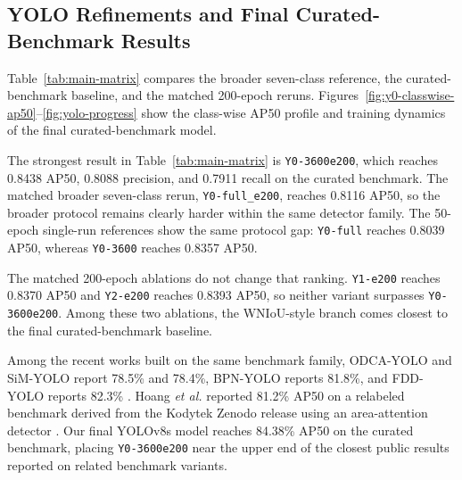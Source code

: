 \documentclass[10pt,a4paper]{article}
\begin{document}
\subsection{YOLO Refinements and Final Curated-Benchmark Results}
\label{sec:main-results}

Table~\ref{tab:main-matrix} compares the broader seven-class reference, the curated-benchmark baseline, and the matched 200-epoch reruns. Figures~\ref{fig:y0-classwise-ap50}--\ref{fig:yolo-progress} show the class-wise AP50 profile and training dynamics of the final curated-benchmark model.

The strongest result in Table~\ref{tab:main-matrix} is \texttt{Y0-3600e200}, which reaches 0.8438 AP50, 0.8088 precision, and 0.7911 recall on the curated benchmark. The matched broader seven-class rerun, \texttt{Y0-full\_e200}, reaches 0.8116 AP50, so the broader protocol remains clearly harder within the same detector family. The 50-epoch single-run references show the same protocol gap: \texttt{Y0-full} reaches 0.8039 AP50, whereas \texttt{Y0-3600} reaches 0.8357 AP50.

The matched 200-epoch ablations do not change that ranking. \texttt{Y1-e200} reaches 0.8370 AP50 and \texttt{Y2-e200} reaches 0.8393 AP50, so neither variant surpasses \texttt{Y0-3600e200}. Among these two ablations, the WNIoU-style branch comes closest to the final curated-benchmark baseline.

Among the recent works built on the same benchmark family, ODCA-YOLO and SiM-YOLO report 78.5\% and 78.4\%, BPN-YOLO reports 81.8\%, and FDD-YOLO reports 82.3\% \citep{odca_yolo,bpn_yolo,sim_yolo,fdd_yolo}. Hoang \textit{et al.} reported 81.2\% AP50 on a relabeled benchmark derived from the Kodytek Zenodo release using an area-attention detector \citep{cmc_wood_area_attention}. Our final YOLOv8s model reaches 84.38\% AP50 on the curated benchmark, placing \texttt{Y0-3600e200} near the upper end of the closest public results reported on related benchmark variants.
\end{document}
